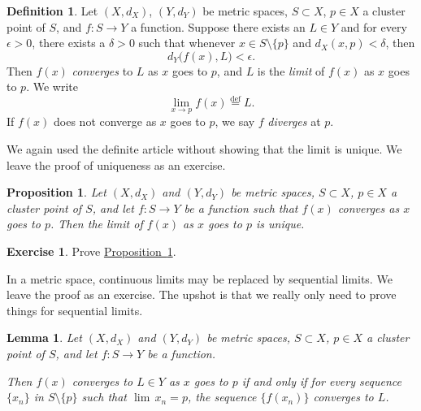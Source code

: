 \documentclass[12pt,openany]{book}
\newcommand{\glsadd}[2][]{}
\theoremstyle{plain}
\newtheorem{lemma}[thm]{Lemma}
\newtheorem{prop}[thm]{Proposition}
\theoremstyle{remark}
\theoremstyle{definition}
\newtheorem{defn}[thm]{Definition}
\newenvironment{exbox}{%
    \def\FrameCommand{\vrule width 1pt \relax\hspace{10pt}}%
    \MakeFramed{\advance\hsize-\width\FrameRestore}%
}{%
    \endMakeFramed
}
\theoremstyle{exercise}
\newtheorem{exercise}{Exercise}[section]
\theoremstyle{example}
\newcommand{\propref}[1]{\hyperref[#1]{Proposition~\ref*{#1}}}
\begin{document}
\begin{defn}
%
Let $(X,d_X)$, $(Y,d_Y)$ be metric spaces, $S \subset X$, $p \in X$ a cluster point of $S$,
and $f \colon S \to Y$ a function.
Suppose there exists an $L \in Y$ and for every $\epsilon > 0$,
there exists a $\delta > 0$ such that whenever $x \in S \setminus \{ p \}$
and $d_X(x,p) < \delta$, then
\begin{equation*}
d_Y\bigl(f(x),L\bigr) < \epsilon .
\end{equation*}
Then $f(x)$
\emph{converges} to $L$ as $x$ goes
to $p$, and $L$ is the \emph{limit} of $f(x)$ as $x$
goes to $p$.  We write
\glsadd{not:limfunc}%
\begin{equation*}
\lim_{x \to p} f(x) \overset{\text{def}}{=} L .
\end{equation*}
If $f(x)$ does not converge as $x$ goes to $p$, we say $f$
\emph{diverges} at $p$.
\end{defn}

We again used the definite article without showing that the
limit is unique.  We leave the proof of uniqueness as an exercise.

\begin{prop} \label{prop:mslimitisunique}
Let $(X,d_X)$ and $(Y,d_Y)$ be metric spaces, $S \subset X$, $p \in X$
a cluster point of $S$, and let $f \colon S \to Y$ be a function
such that $f(x)$ converges as $x$ goes to $p$.  Then
the limit of $f(x)$ as $x$ goes to $p$ is unique.
\end{prop}

\begin{exbox}
\begin{exercise}
Prove \propref{prop:mslimitisunique}.
\end{exercise}
\end{exbox}


In a metric space, continuous limits may be replaced by sequential limits.
We leave the proof as an exercise.
The upshot is that we really only need to prove things for sequential limits.

\begin{lemma}\label{ms:seqflimit:lemma}
Let $(X,d_X)$ and $(Y,d_Y)$ be metric spaces, $S \subset X$, $p \in X$
a cluster point of $S$, and let $f \colon S \to Y$ be a function.

Then
$f(x)$ converges to $L \in Y$ as $x$ goes to $p$ if and only if for every sequence $\{ x_n \}$
in $S \setminus \{p\}$
such that $\lim\, x_n = p$,
the sequence $\bigl\{ f(x_n) \bigr\}$ converges to $L$.
\end{lemma}
\end{document}
